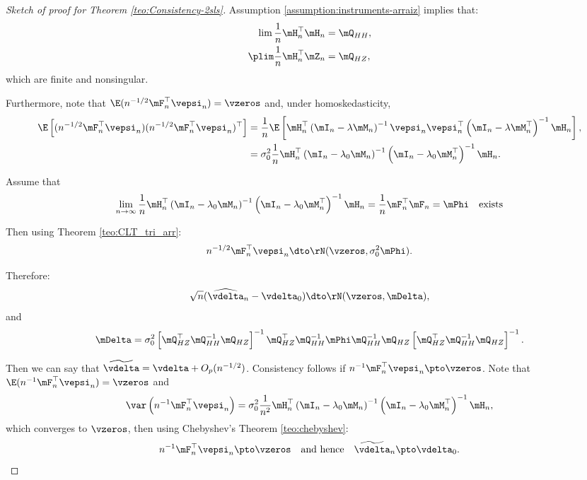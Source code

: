 \documentclass[english,12pt]{book}\usepackage[]{graphicx}\usepackage[]{xcolor}
\begin{document}
\begin{proof}[Sketch of proof for Theorem \ref{teo:Consistency-2sls}]
Assumption \ref{assumption:instruments-arraiz} implies that:
\begin{equation*}
\begin{aligned}
  \lim \frac{1}{n}\mH_n^\top\mH_n &= \mQ_{HH}, \\
  \plim \frac{1}{n}\mH_n^\top\mZ_n & = \mQ_{HZ},
\end{aligned}
\end{equation*}
%
which are finite and nonsingular. 

Furthermore, note that $\E(n^{-1/2}\mF_n^\top\vepsi_n) = \vzeros$ and, under homoskedasticity,  
\begin{equation*}
\begin{aligned}
\E\left[(n^{-1/2}\mF_n^\top\vepsi_n)(n^{-1/2}\mF_n^\top\vepsi_n)^\top\right] & = \frac{1}{n}\E\left[\mH_n^\top\left(\mI_n -\lambda\mM_n\right)^{-1}\vepsi_n\vepsi_n^\top\left(\mI_n -\lambda\mM_n^\top\right)^{-1} \mH_n \right], \\
& = \sigma^2_0\frac{1}{n}\mH_n^\top\left(\mI_n -\lambda_0\mM_n\right)^{-1}\left(\mI_n -\lambda_0\mM_n^\top\right)^{-1} \mH_n. 
\end{aligned}
\end{equation*}

Assume that 
\begin{equation*}
\lim_{n\to\infty}\frac{1}{n}\mH_n^\top\left(\mI_n -\lambda_0\mM_n\right)^{-1}\left(\mI_n -\lambda_0\mM_n^\top\right)^{-1} \mH_n = \frac{1}{n}\mF^\top_n\mF_n =\mPhi\quad \mbox{exists}
\end{equation*}

Then using Theorem \ref{teo:CLT_tri_arr}:
\begin{equation*}
n^{-1/2}\mF_n^\top\vepsi_n\dto \rN(\vzeros, \sigma^2_0\mPhi).
\end{equation*}

Therefore:
\begin{equation*}
\sqrt{n}(\widehat{\vdelta}_{n} - \vdelta_0) \dto \rN(\vzeros, \mDelta),
\end{equation*}
%
and
\begin{equation*}
  \mDelta = \sigma^2_{0}\left[\mQ_{HZ}^\top\mQ_{HH}^{-1}\mQ_{HZ}\right]^{-1}\mQ_{HZ}^\top\mQ_{HH}^{-1}\mPhi\mQ_{HH}^{-1}\mQ_{HZ}\left[\mQ_{HZ}^\top\mQ_{HH}^{-1}\mQ_{HZ}\right]^{-1}.
\end{equation*}

Then we can say that $\widetilde{\vdelta} = \vdelta + O_p(n^{-1/2})$. Consistency follows if $n^{-1}\mF_n^\top\vepsi_n\pto \vzeros$. Note that $\E(n^{-1}\mF_n^\top\vepsi_n) = \vzeros$ and 
\begin{equation*}
\var\left(n^{-1}\mF_n^\top\vepsi_n\right)=\sigma^2_0\frac{1}{n^2}\mH_n^\top\left(\mI_n -\lambda_0\mM_n\right)^{-1}\left(\mI_n -\lambda_0\mM_n^\top\right)^{-1} \mH_n,
\end{equation*}
%
which converges to $\vzeros$, then using Chebyshev's Theorem \ref{teo:chebyshev}:
\begin{equation*}
  n^{-1}\mF_n^\top\vepsi_n\pto \vzeros\quad\mbox{and hence}\quad \widetilde{\vdelta}_n\pto\vdelta_0.
\end{equation*}
\end{proof}
\end{document}
